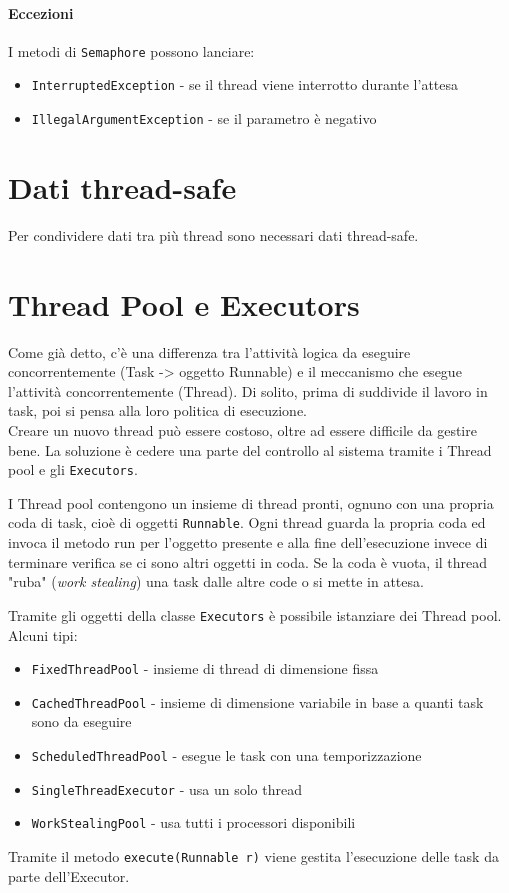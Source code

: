 \paragraph{Eccezioni} I metodi di \texttt{Semaphore} possono lanciare:
\begin{itemize}
\item \texttt{InterruptedException} - se il thread viene interrotto durante l'attesa
\item \texttt{IllegalArgumentException} - se il parametro è negativo
\end{itemize}

\section{Dati thread-safe}
Per condividere dati tra più thread sono necessari dati thread-safe. 

\section{Thread Pool e Executors}
Come già detto, c'è una differenza tra l'attività logica da eseguire concorrentemente (Task -> oggetto Runnable) e il meccanismo che esegue l'attività concorrentemente (Thread). Di solito, prima di suddivide il lavoro in task, poi si pensa alla loro politica di esecuzione. \\
Creare un nuovo thread può essere costoso, oltre ad essere difficile da gestire bene. La soluzione è cedere una parte del controllo al sistema tramite i Thread pool e gli \texttt{Executors}.

I Thread pool contengono un insieme di thread pronti, ognuno con una propria coda di task, cioè di oggetti \texttt{Runnable}. Ogni thread guarda la propria coda ed invoca il metodo run per l'oggetto presente e alla fine dell'esecuzione invece di terminare verifica se ci sono altri oggetti in coda. Se la coda è vuota, il thread "ruba" (\textit{work stealing}) una task dalle altre code o si mette in attesa.

Tramite gli oggetti della classe \texttt{Executors} è possibile istanziare dei Thread pool. Alcuni tipi:
\begin{itemize}
\item \texttt{FixedThreadPool} - insieme di thread di dimensione fissa
\item \texttt{CachedThreadPool} - insieme di dimensione variabile in base a quanti task sono da eseguire
\item \texttt{ScheduledThreadPool} - esegue le task con una temporizzazione
\item \texttt{SingleThreadExecutor} - usa un solo thread
\item \texttt{WorkStealingPool} - usa tutti i processori disponibili
\end{itemize}
Tramite il metodo \texttt{execute(Runnable r)} viene gestita l'esecuzione delle task da parte dell'Executor.

